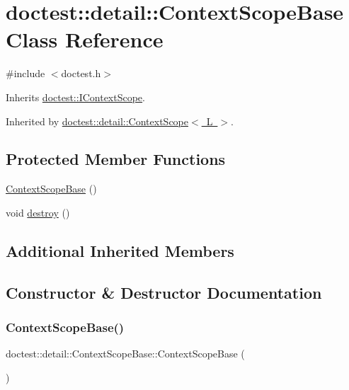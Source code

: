 \hypertarget{classdoctest_1_1detail_1_1_context_scope_base}{}\section{doctest\+:\+:detail\+:\+:Context\+Scope\+Base Class Reference}
\label{classdoctest_1_1detail_1_1_context_scope_base}


{\ttfamily \#include $<$doctest.\+h$>$}



Inherits \mbox{\hyperlink{structdoctest_1_1_i_context_scope}{doctest\+::\+I\+Context\+Scope}}.



Inherited by \mbox{\hyperlink{classdoctest_1_1detail_1_1_context_scope}{doctest\+::detail\+::\+Context\+Scope$<$ L $>$}}.

\subsection*{Protected Member Functions}
\begin{DoxyCompactItemize}
\item 
\mbox{\hyperlink{classdoctest_1_1detail_1_1_context_scope_base_af3a3ff7ad6b98142ef0f7e1d01912d48}{Context\+Scope\+Base}} ()
\item 
void \mbox{\hyperlink{classdoctest_1_1detail_1_1_context_scope_base_a6f223de9a972b08bf1b9e9d2d99ab4c6}{destroy}} ()
\end{DoxyCompactItemize}
\subsection*{Additional Inherited Members}


\subsection{Constructor \& Destructor Documentation}
\mbox{\label{classdoctest_1_1detail_1_1_context_scope_base_af3a3ff7ad6b98142ef0f7e1d01912d48}} 
\subsubsection{\texorpdfstring{Context\+Scope\+Base()}{ContextScopeBase()}}
{\footnotesize\ttfamily doctest\+::detail\+::\+Context\+Scope\+Base\+::\+Context\+Scope\+Base (\begin{DoxyParamCaption}{ }\end{DoxyParamCaption})\hspace{0.3cm}{\ttfamily [protected]}}




